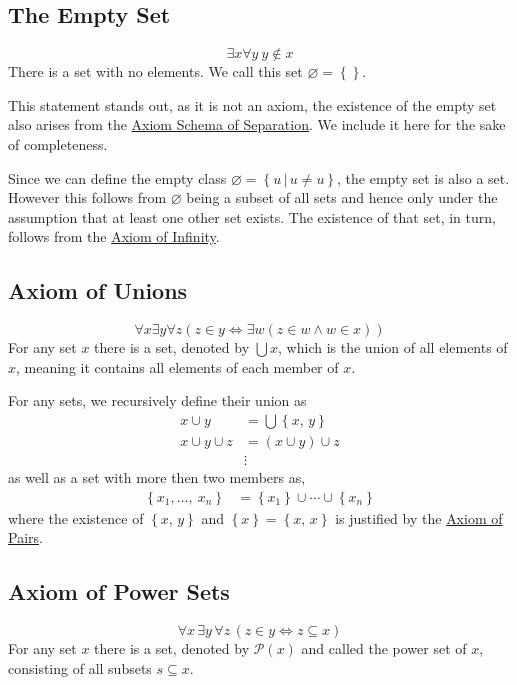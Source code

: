 \documentclass[../../main.tex]{subfiles}
\begin{document}
\subsection{The Empty Set}\label{ZF4}
$$\exists x \forall y \ y \notin x$$
There is a set with no elements. We call this set $\varnothing = \left\{\right\}$. \cite{Gol17}

This statement stands out, as it is not an axiom, the existence of the empty set also arises from the \hyperref[ZF3]{Axiom Schema of Separation}.
We include it here for the sake of completeness.

Since we can define the empty class $\varnothing = \left\{u\, \vert\, u \neq u\right\}$, the empty set is also a set.
However this follows from $\varnothing$ being a subset of all sets and hence only under the assumption that at least one other set exists.
The existence of that set, in turn, follows from the \hyperref[ZF7]{Axiom of Infinity}.\cite[p.6]{Jec78}

\subsection{Axiom of Unions}\label{ZF5}
$$\forall x \exists y \forall z \left(z \in y \iff \exists w \left(z \in w \wedge w \in x\right)\right)$$
For any set $x$ there is a set, denoted by $\bigcup x$, which is the union of all elements of $x$,
meaning it contains all elements of each member of $x$.

For any sets, we recursively define their union as
\begin{align*}
    x \cup y &= \bigcup \left\{x,\, y\right\} \\
    x \cup y \cup z &= \left(x \cup y\right) \cup z \\
    &\vdots
\end{align*}
as well as a set with more then two members as,
\begin{align*}
    \left\{x_1,\ldots,\ x_n\right\} &= \left\{x_1\right\} \cup \cdots \cup \left\{x_n\right\}
\end{align*}
where the existence of $\left\{x,\, y\right\}$ and $\left\{x\right\} = \left\{x,\, x\right\}$ is justified by the \hyperref[ZF2]{Axiom of Pairs}. \cite[p.6]{Jec78}

\subsection{Axiom of Power Sets}\label{ZF6}
$$\forall x\, \exists y\, \forall z\, \left(z \in y \iff z \subseteq x\right)$$
For any set $x$ there is a set, denoted by $\mathcal{P}(x)$ and called the power set of $x$, consisting of all subsets $s \subseteq x$.
\end{document}
